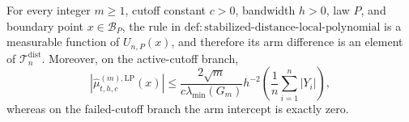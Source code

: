 For every integer \(m\geq1\), cutoff constant \(c>0\), bandwidth \(h>0\), law \(P\), and boundary point \(x\in\mathcal B_P\), the rule in \(\mathrm{def:stabilized\text{-}distance\text{-}local\text{-}polynomial}\) is a measurable function of \(U_{n,P}(x)\), and therefore its arm difference is an element of \(\mathcal T_n^{\mathrm{dist}}\).  Moreover, on the active-cutoff branch,
\[
 \left|\widehat\mu^{(m),\mathrm{LP}}_{t,h,c}(x)\right|
 \leq
 \frac{2\sqrt m}{c\lambda_{\min}(G_m)}h^{-2}
 \left(\frac1n\sum_{i=1}^n|Y_i|\right),
\]
whereas on the failed-cutoff branch the arm intercept is exactly zero.